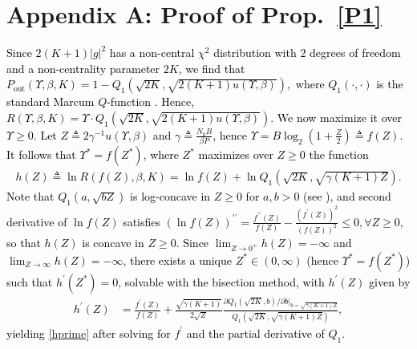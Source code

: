 \documentclass[12pt, draftcls, onecolumn]{IEEEtran}
\theoremstyle{plain}
\theoremstyle{definition}
\theoremstyle{remark}
\newcommand\hlt[1]{\textcolor{black}{#1}}
\begin{document}
\begin{appendices}\label{S8}
\section*{Appendix A: Proof of Prop.~\ref{P1}}\label{X1}
\hlt{Since $2(K{+}1)|g|^{2}$ has a non-central $\chi^{2}$ distribution with $2$ degrees of freedom and a non-centrality parameter $2K$, we find that $P_{\mathrm{out}}(\Upsilon,\beta,K){=}1{-}Q_{1}(\sqrt{2K},\sqrt{2(K{+}1)u(\Upsilon,\beta)}),$ where $Q_{1}(\cdot,\cdot)$ is the standard Marcum $Q$-function \cite{Rician}. Hence,
$
	R(\Upsilon,\beta,K) = \Upsilon\cdot Q_{1}(\sqrt{2K},\sqrt{2(K + 1)u(\Upsilon,\beta)}).
$
We now maximize it over  $\Upsilon{\geq}0$. Let $Z{\triangleq}2\gamma^{-1}u\left(\Upsilon,\beta\right)$ and $\gamma{\triangleq}\frac{N_{0}B}{\beta P}$, hence $\Upsilon{=}B\log_{2}\left(1{+}\frac{Z}{2}\right){\triangleq}f(Z)$. It follows that $\Upsilon^{*}{=}f\left(Z^{*}\right)$, where $Z^{*}$ maximizes over $Z{\geq}0$ the function
\begin{align}\label{eq:Pout_defn}
    h(Z) \triangleq \ln R(f(Z),\beta,K) = \ln f(Z) + \ln Q_1 (\sqrt{2K}, \sqrt{\gamma(K + 1)Z}).
\end{align}
Note that $Q_{1}\left(a,\sqrt{bZ}\right)$ is log-concave in $Z{\geq}0$ for $a,b{>}0$ (see \cite{MarcumTB}), and second derivative of $\ln f(Z)$ satisfies $(\ln f(Z))^{\prime\prime}{=}\frac{f^{\prime\prime}(Z)}{f(Z)}{-}\frac{(f^{\prime}(Z))^{2}}{(f(Z))^2}{\leq}0,{\forall}Z{\geq}0$, so that $h(Z)$ is concave in $Z{\geq}0$. Since $\lim_{Z{\to}0^{+}}h(Z){=}-\infty$ and $\lim_{Z{\to}\infty}h(Z){=}-\infty$, there exists a unique $Z^{*}{\in}(0,\infty)$ (hence $\Upsilon^{*}{=}f\left(Z^{*}\right)$) such that $h^{\prime}(Z^{*}){=}0$, solvable with the bisection method, with $h^{\prime}(Z)$ given by
\begin{align}
    \nonumber
    h^\prime(Z) &= \frac{f^\prime(Z)}{f(Z)} + \frac{\sqrt{\gamma(K + 1)}}{2\sqrt{Z}}\frac{\partial Q_1(\sqrt{2K},b)/\partial b\big|_{b=\sqrt{\gamma(K + 1)Z}}}{Q_1(\sqrt{2K},\sqrt{\gamma(K + 1)Z})},
\end{align}
yielding \eqref{hprime} after solving for $f^{\prime}$ and the partial derivative of $Q_{1}$.}
\vspace{-4mm}


\end{appendices}
\end{document}

